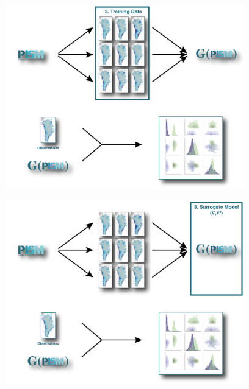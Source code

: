 \documentclass[aspectratio=169,hide notes,intlimits]{beamer}
\begin{document}
\begin{frame}{}
  \vspace{-1.5em}
    \begin{minipage}[t][8.2cm][t]{\textwidth}
    \begin{figure}
      \includegraphics[height=8cm]{surrogate_model_2}
    \end{figure}
    \end{minipage}
\end{frame}

\begin{frame}{}
  \vspace{-1.5em}
    \begin{minipage}[t][8.2cm][t]{\textwidth}
    \begin{figure}
      \includegraphics[height=8cm]{surrogate_model_3}
    \end{figure}
    \end{minipage}
\end{frame}
\end{document}

